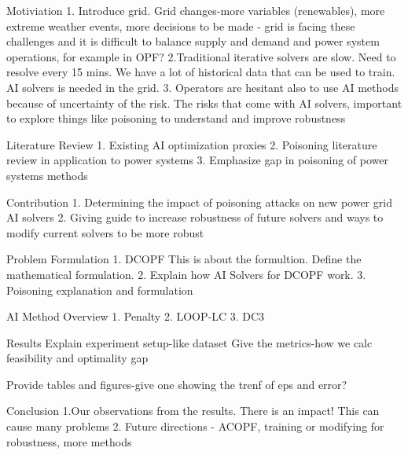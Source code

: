 Motiviation
1. Introduce grid. Grid changes-more variables (renewables), more extreme weather events, more decisions to be made - grid is facing these challenges and it is difficult to balance supply and demand and power system operations, for example in OPF?
2.Traditional iterative solvers are slow. Need to resolve every 15 mins. We have a lot of historical data that can be used to train. AI solvers is needed in the grid. 
3. Operators are hesitant also to use AI methods because of uncertainty of the risk. The risks that come with AI solvers, important to explore things like poisoning to understand and improve robustness

Literature Review
1. Existing AI optimization proxies
2. Poisoning literature review in application to power systems 
3. Emphasize gap in poisoning of power systems methods

Contribution
1. Determining the impact of poisoning attacks on new power grid AI solvers
2. Giving guide to increase robustness of future solvers and ways to modify current solvers to be more robust


Problem Formulation
1. DCOPF
This is about the formultion. Define the mathematical formulation. 
2. Explain how AI Solvers for DCOPF work.
3. Poisoning explanation and formulation

AI Method Overview
1. Penalty
2. LOOP-LC
3. DC3

Results
Explain experiment setup-like dataset 
Give the metrics-how we calc feasibility and optimality gap

Provide tables and figures-give one showing the trenf of eps and error?

Conclusion
1.Our observations from the results. There is an impact! This can cause many problems 
2. Future directions - ACOPF, training or modifying for robustness, more methods


